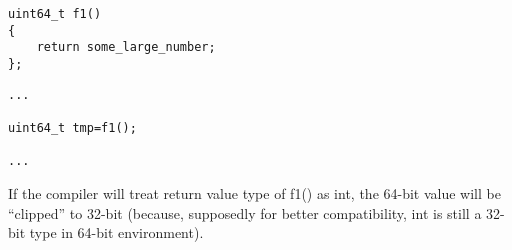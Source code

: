 \begin{lstlisting}[caption=file1.c]
uint64_t f1()
{
	return some_large_number;
};
\end{lstlisting}

\begin{lstlisting}[caption=file2.c]
...

uint64_t tmp=f1();

...
\end{lstlisting}

{If the compiler will treat return value type of f1() as int, the 64-bit value will be ``clipped'' to 32-bit
(because, supposedly for better compatibility, int is still a 32-bit type in 64-bit environment)}.

